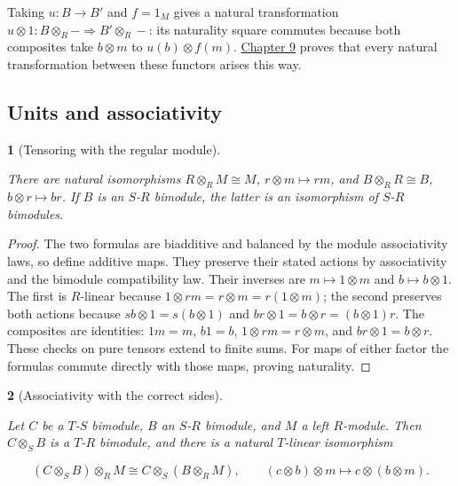 \documentclass[11pt,a4paper]{article}
\newcommand{\mathheading}{}
\theoremstyle{plain}
\newtheorem*{plainstatement}{\mathheading}
\theoremstyle{definition}
\newenvironment{mathstatement}[3]{\renewcommand{\mathheading}{#1 #2}\begin{plainstatement}[#3]}{\end{plainstatement}}
\begin{document}
Taking \(u:B\to B'\) and \(f=1_M\) gives a natural transformation \(u\otimes1:B\otimes_R-\Rightarrow B'\otimes_R-\): its naturality square commutes because both composites take \(b\otimes m\) to \(u(b)\otimes f(m)\). \hyperref[chapter-09]{Chapter 9} proves that every natural transformation between these functors arises this way.

 
\subsection{Units and associativity}
\label{units}
 
\begin{mathstatement}{Theorem}{6.4}{Tensoring with the regular module}
\label{env-6-4}

There are natural isomorphisms \(R\otimes_R M\cong M\), \(r\otimes m\mapsto rm\), and \(B\otimes_R R\cong B\), \(b\otimes r\mapsto br\). If \(B\) is an \(S\)-\(R\) bimodule, the latter is an isomorphism of \(S\)-\(R\) bimodules.


\par{}\par

\end{mathstatement}
 
\begin{proof}

The two formulas are biadditive and balanced by the module associativity laws, so define additive maps. They preserve their stated actions by associativity and the bimodule compatibility law. Their inverses are \(m\mapsto1\otimes m\) and \(b\mapsto b\otimes1\). The first is \(R\)-linear because \(1\otimes rm=r\otimes m=r(1\otimes m)\); the second preserves both actions because \(sb\otimes1=s(b\otimes1)\) and \(br\otimes1=b\otimes r=(b\otimes1)r\). The composites are identities: \(1m=m\), \(b1=b\), \(1\otimes rm=r\otimes m\), and \(br\otimes1=b\otimes r\). These checks on pure tensors extend to finite sums. For maps of either factor the formulas commute directly with those maps, proving naturality.


\end{proof}
 
\begin{mathstatement}{Theorem}{6.5}{Associativity with the correct sides}
\label{env-6-5}

Let \(C\) be a \(T\)-\(S\) bimodule, \(B\) an \(S\)-\(R\) bimodule, and \(M\) a left \(R\)-module. Then \(C\otimes_S B\) is a \(T\)-\(R\) bimodule, and there is a natural \(T\)-linear isomorphism

 \[(C\otimes_S B)\otimes_R M\cong C\otimes_S(B\otimes_R M),\qquad(c\otimes b)\otimes m\longmapsto c\otimes(b\otimes m).\] 
\par{}\par

\end{mathstatement}
 
\end{document}
